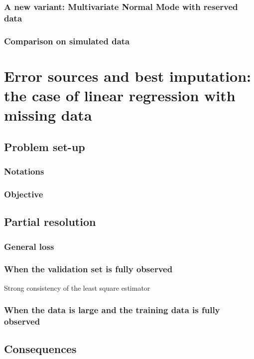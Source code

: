 \documentclass[12pt, a4paper]{memoir}
\begin{document}
		\subsection{A new variant: Multivariate Normal Mode with reserved data}
		\subsection{Comparison on simulated data}
		

		
\chapter{Error sources and best imputation: the case of linear regression with missing data}
\label{linreg}
	\section{Problem set-up}
		\subsection{Notations}
		\subsection{Objective}
	\section{Partial resolution}
		\subsection{General loss}
		\subsection{When the validation set is fully observed}
		Strong consistency of the least square estimator \citep{consistency_linreg}
		\subsection{When the data is large and the training data is fully observed}
	\section{Consequences}
\end{document}
